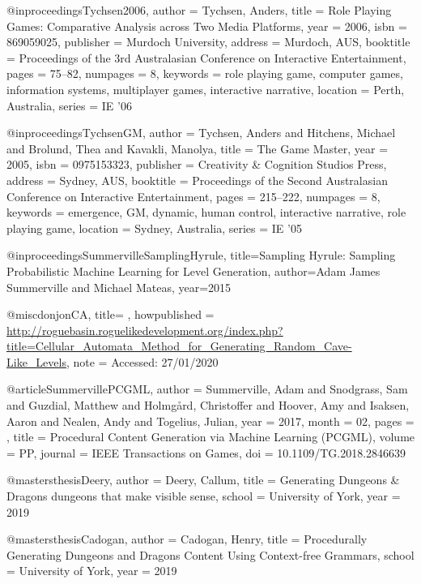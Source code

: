 @inproceedings{Tychsen2006,
author = {Tychsen, Anders},
title = {Role Playing Games: Comparative Analysis across Two Media Platforms},
year = {2006},
isbn = {869059025},
publisher = {Murdoch University},
address = {Murdoch, AUS},
booktitle = {Proceedings of the 3rd Australasian Conference on Interactive Entertainment},
pages = {75–82},
numpages = {8},
keywords = {role playing game, computer games, information systems, multiplayer games, interactive narrative},
location = {Perth, Australia},
series = {IE ’06}
}

@inproceedings{TychsenGM,
author = {Tychsen, Anders and Hitchens, Michael and Brolund, Thea and Kavakli, Manolya},
title = {The Game Master},
year = {2005},
isbn = {0975153323},
publisher = {Creativity & Cognition Studios Press},
address = {Sydney, AUS},
booktitle = {Proceedings of the Second Australasian Conference on Interactive Entertainment},
pages = {215–222},
numpages = {8},
keywords = {emergence, GM, dynamic, human control, interactive narrative, role playing game},
location = {Sydney, Australia},
series = {IE ’05}
}
  


@inproceedings{SummervilleSamplingHyrule,
  title={Sampling Hyrule: Sampling Probabilistic Machine Learning for Level Generation},
  author={Adam James Summerville and Michael Mateas},
  year={2015}
}

@misc{donjonCA,
title= {},
howpublished = {\url{http://roguebasin.roguelikedevelopment.org/index.php?title=Cellular_Automata_Method_for_Generating_Random_Cave-Like_Levels}},
note = {Accessed: 27/01/2020}
}

@article{SummervillePCGML,
author = {Summerville, Adam and Snodgrass, Sam and Guzdial, Matthew and Holmgård, Christoffer and Hoover, Amy and Isaksen, Aaron and Nealen, Andy and Togelius, Julian},
year = {2017},
month = {02},
pages = {},
title = {Procedural Content Generation via Machine Learning (PCGML)},
volume = {PP},
journal = {IEEE Transactions on Games},
doi = {10.1109/TG.2018.2846639}
}

@mastersthesis{Deery,
author = {Deery, Callum},
title = {Generating Dungeons & Dragons dungeons that make visible sense},
school = {University of York},
year = {2019}
}

@mastersthesis{Cadogan,
author = {Cadogan, Henry},
title = {Procedurally Generating Dungeons and Dragons Content Using Context-free Grammars},
school = {University of York},
year = {2019}
}

